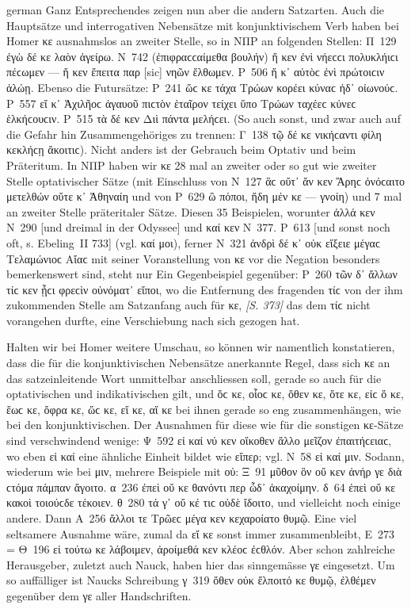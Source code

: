 \begin{otherlanguage*}{german}
Ganz Entsprechendes zeigen nun aber die andern Satzarten. Auch die Hauptsätze und interrogativen Nebensätze mit konjunktivischem Verb haben bei Homer κε ausnahmslos an zweiter Stelle, so in ΝΠΡ an folgenden Stellen: Π~129 ἐγὼ δέ κε λαὸν ἀγείρω. Ν~742 (ἐπιφραϲϲαίμεθα βουλήν) ἤ κεν ἐνὶ νήεϲϲι πολυκλήιϲι πέϲωμεν — ἤ κεν ἔπειτα παρ [sic] νηῶν ἔλθωμεν. Ρ~506 ἤ κ᾽ αὐτὸϲ ἐνὶ πρώτοιϲιν ἁλώῃ. Ebenso die Futursätze: Ρ~241 ὥϲ κε τάχα Τρώων κορέει κύναϲ ἠδ᾽ οἰωνούϲ. Ρ~557 εἴ κ᾽ Ἀχιλῆοϲ ἀγαυοῦ πιϲτὸν ἑταῖρον τείχει ὕπο Τρώων ταχέεϲ κύνεϲ ἑλκήϲουϲιν. Ρ~515 τὰ δέ κεν Διὶ πάντα μελήϲει. (So auch sonst, und zwar auch auf die Gefahr hin Zusammengehöriges zu trennen: Γ~138 τῷ δέ κε νικήϲαντι φίλη κεκλήϲῃ ἄκοιτιϲ). Nicht anders ist der Gebrauch beim Optativ und beim Präteritum. In ΝΠΡ haben wir κε 28 mal an zweiter oder so gut wie zweiter Stelle optativischer Sätze (mit Einschluss von Ν~127 ἃϲ οὔτ᾽ ἄν κεν Ἄρηϲ ὀνόϲαιτο μετελθών οὔτε κ᾽ Ἀθηναίη und von Ρ~629 ὢ πόποι, ἤδη μέν κε — γνοίη) und 7 mal an zweiter Stelle präteritaler Sätze. Diesen 35 Beispielen, worunter ἀλλά κεν Ν~290 [und dreimal in der Odyssee] und καί κεν Ν~377. Ρ~613 [und sonst noch oft, s. Ebeling~II 733] (vgl. καί μοι), ferner Ν~321 ἀνδρὶ δέ κ᾽ οὐκ εἴξειε μέγαϲ Τελαμώνιοϲ Αἴαϲ mit seiner Voranstellung von κε vor die Negation besonders bemerkenswert sind, steht nur Ein Gegenbeispiel gegenüber: Ρ~260 τῶν δ᾽ ἄλλων τίϲ κεν ᾗϲι φρεϲὶν οὐνόματ᾽ εἴποι, wo die Entfernung des fragenden τίϲ von der ihm zukommenden Stelle am Satzanfang auch für κε, \hypertarget{p373}{\emph{[S. 373]}}\label{p373} das dem τίϲ nicht vorangehen durfte, eine Verschiebung nach sich gezogen hat.

Halten wir bei Homer weitere Umschau, so können wir namentlich konstatieren, dass die für die konjunktivischen Nebensätze anerkannte Regel, dass sich κε an das satzeinleitende Wort unmittelbar anschliessen soll, gerade so auch für die optativischen und indikativischen gilt, und ὅϲ κε, οἷοϲ κε, ὅθεν κε, ὅτε κε, εἰϲ ὅ κε, ἕωϲ κε, ὄφρα κε, ὥϲ κε, εἴ κε, αἵ κε bei ihnen gerade so eng zusammenhängen, wie bei den konjunktivischen. Der Ausnahmen für diese wie für die sonstigen κε-Sätze sind verschwindend wenige: Ψ~592 εἰ καί νύ κεν οἴκοθεν ἄλλο μεῖζον ἐπαιτήϲειαϲ, wo eben εἰ καί eine ähnliche Einheit bildet wie εἴπερ; vgl. Ν~58 εἰ καί μιν. Sodann, wiederum wie bei μιν, mehrere Beispiele mit οὐ: Ξ~91 μῦθον ὃν οὔ κεν ἀνήρ γε διὰ ϲτόμα πάμπαν ἄγοιτο. α~236 ἐπεὶ οὔ κε θανόντι περ ὧδ᾽ ἀκαχοίμην. δ~64 ἐπεὶ οὔ κε κακοὶ τοιούϲδε τέκοιεν. θ~280 τά γ᾽ οὔ κέ τιϲ οὐδὲ ἴδοιτο, und vielleicht noch einige andere. Dann Α~256 ἄλλοι τε Τρῶεϲ μέγα κεν κεχαροίατο θυμῷ. Eine viel seltsamere Ausnahme wäre, zumal da εἴ κε sonst immer zusammenbleibt, Ε~273 = Θ~196 εἰ τούτω κε λάβοιμεν, ἀροίμεθά κεν κλέοϲ ἐϲθλόν. Aber schon zahlreiche Herausgeber, zuletzt auch Nauck, haben hier das sinngemässe γε eingesetzt. Um so auffälliger ist Naucks Schreibung γ~319 ὅθεν οὐκ ἔλποιτό κε θυμῷ, ἐλθέμεν gegenüber dem γε aller Handschriften.


\end{otherlanguage*}
